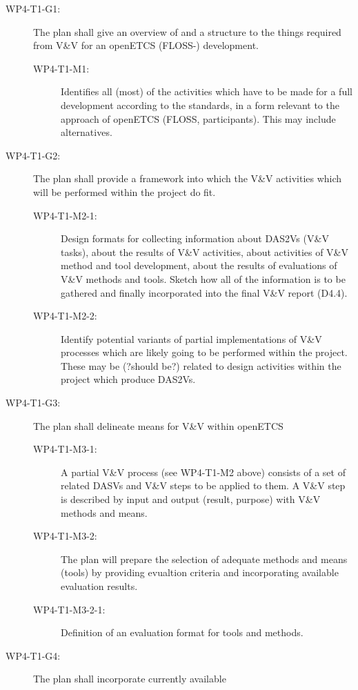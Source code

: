 \begin{description}
\item[WP4-T1-G1:] The plan shall give an overview of and a structure to
  the things required from V\&V for an openETCS (FLOSS-) development.
  \begin{description}
  \item[WP4-T1-M1:] Identifies all (most) of the activities which have
    to be made for a full development according to the standards, in a
    form relevant to the approach of openETCS (FLOSS,
    participants). This may include alternatives.
  \end{description}
\item[WP4-T1-G2:] The plan shall provide a framework into which the V\&V
  activities which will be performed within the project do fit.
  \begin{description}
  \item[WP4-T1-M2-1:] Design formats for collecting information about
    DAS2Vs (V\&V tasks), about the results of V\&V activities, about
    activities of V\&V method and tool development, about the results
    of evaluations of V\&V methods and tools. Sketch how all of the
    information is to be gathered and finally incorporated into the
    final V\&V report (D4.4).
  \item[WP4-T1-M2-2:] Identify potential variants of partial
    implementations of V\&V processes which are likely going to be
    performed within the project. These may be (?should be?) related
    to design activities within the project which produce DAS2Vs.
  \end{description}
\item[WP4-T1-G3:] The plan shall delineate means for V\&V within openETCS
  \begin{description}
  \item[WP4-T1-M3-1:] A partial V\&V process (see WP4-T1-M2 above)
    consists of a set of related DASVs and V\&V steps to be applied to
    them. A V\&V step is described by input and output (result,
    purpose) with V\&V methods and means.
  \item[WP4-T1-M3-2:] The plan will prepare the selection of adequate
    methods and means (tools) by providing evualtion criteria and
    incorporating available evaluation results.
  \item[WP4-T1-M3-2-1:] Definition of an evaluation format for tools
    and methods.
  \end{description}
\item[WP4-T1-G4:] The plan shall incorporate currently available

\end{description}
